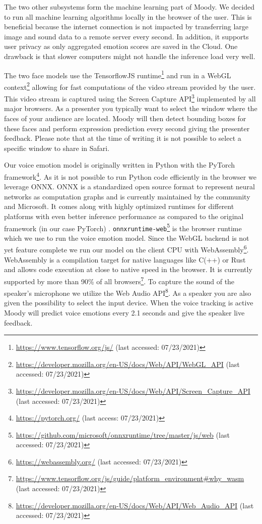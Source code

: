 The two other subsystems form the machine learning part of Moody. We decided to run all machine learning algorithms locally in the browser of the user. This is beneficial because the internet connection is not impacted by transferring large image and sound data to a remote server every second. In addition, it supports user privacy as only aggregated emotion scores are saved in the Cloud. One drawback is that slower computers might not handle the inference load very well.

The two face models use the TensorflowJS runtime\footnote{\url{https://www.tensorflow.org/js/} (last accessed: 07/23/2021)} and run in a WebGL context\footnote{\url{https://developer.mozilla.org/en-US/docs/Web/API/WebGL_API} (last accessed: 07/23/2021)} allowing for fast computations of the video stream provided by the user. This video stream is captured using the Screen Capture API\footnote{\url{https://developer.mozilla.org/en-US/docs/Web/API/Screen_Capture_API} (last accessed: 07/23/2021)} implemented by all major browsers. As a presenter you typically want to select the window where the faces of your audience are located. Moody will then detect bounding boxes for these faces and perform expression prediction every second giving the presenter feedback. Please note that at the time of writing it is not possible to select a specific window to share in Safari.

Our voice emotion model is originally written in Python with the PyTorch framework\footnote{\url{https://pytorch.org/} (last access: 07/23/2021)}. As it is not possible to run Python code efficiently in the browser we leverage ONNX. ONNX is a standardized open source format to represent neural networks as computation graphs and is currently maintained by the community and Microsoft. It comes along with highly optimized runtimes for different platforms with even better inference performance as compared to the original framework (in our case PyTorch) \cite{onnx_runtime_developers_onnx_2021}. \texttt{onnxruntime-web}\footnote{\url{https://github.com/microsoft/onnxruntime/tree/master/js/web} (last accessed: 07/23/2021)} is the browser runtime which we use to run the voice emotion model. Since the WebGL backend is not yet feature complete we run our model on the client CPU with WebAssembly\footnote{\url{https://webassembly.org/} (last accessed: 07/23/2021)}. WebAssembly is a compilation target for native languages like C(++) or Rust and allows code execution at close to native speed in the browser. It is currently supported by more than 90\% of all browsers\footnote{\url{https://www.tensorflow.org/js/guide/platform_environment#why_wasm} (last accessed: 07/23/2021)}. To capture the sound of the speaker’s microphone we utilize the Web Audio API\footnote{\url{https://developer.mozilla.org/en-US/docs/Web/API/Web_Audio_API} (last accessed: 07/23/2021)}. As a speaker you are also given the possibility to select the input device. When the voice tracking is active Moody will predict voice emotions every 2.1 seconds and give the speaker live feedback.

